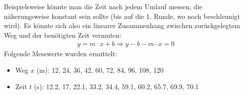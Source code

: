 \documentclass[letterpaper,10pt,english]{jupyterBook}
\begin{document}
\sphinxAtStartPar
Beispielsweise könnte man die Zeit nach jedem Umlauf messen, die näherungsweise konstant sein sollte (bis auf die 1. Runde, wo noch beschleunigt wird). Es könnte sich also ein linearer Zusammenhang zwischen zurückgelegtem Weg und der benötigten Zeit vermuten:
\begin{equation*}
\begin{split}y = m\cdot x + b \Rightarrow y - b - m\cdot x = 0\end{split}
\end{equation*}
\sphinxAtStartPar
Folgende Messwerte wurden ermittelt:
\begin{itemize}
\item {} 
\sphinxAtStartPar
Weg  \(x\) (m): 12, 24, 36, 42, 60, 72, 84, 96, 108, 120

\item {} 
\sphinxAtStartPar
Zeit \(t\) (s): 12.2, 17, 22.1, 33.2, 34.4, 59.1, 60.2, 65.7, 69.9, 70.1

\end{itemize}
\end{document}
